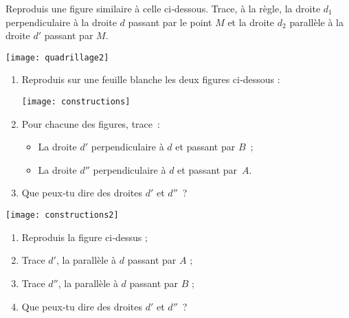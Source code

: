 \begin{exercice}[Quadrillage]
Reproduis une figure similaire à celle ci‑dessous. Trace, à la règle, la droite $d_1$ perpendiculaire à la droite $d$ passant par le point $M$ et la droite $d_2$ parallèle à la droite $d'$ passant par $M$.
\begin{center} \texttt{[image: quadrillage2]}  \end{center}
\end{exercice}


\begin{exercice}[Constructions]
\begin{enumerate}
 \item Reproduis sur une feuille blanche les deux figures ci‑dessous :
 \begin{center} \texttt{[image: constructions]}  \end{center}
 \item Pour chacune des figures, trace :
  \begin{itemize}
   \item La droite $d'$ perpendiculaire à $d$ et passant par $B$ ;
   \item La droite $d''$ perpendiculaire à $d$ et passant par $A$.
   \end{itemize}
 \item Que peux‑tu dire des droites $d'$ et $d''$ ?
 \end{enumerate}
\end{exercice}


\begin{exercice}
 \begin{center} \texttt{[image: constructions2]}  \end{center}
\begin{enumerate}
 \item Reproduis la figure ci‑dessus ;
 \item Trace $d'$, la parallèle à $d$ passant par $A$ ;
 \item Trace $d''$, la parallèle à $d$ passant par $B$ ;
 \item Que peux‑tu dire des droites $d'$ et $d''$ ?
 \end{enumerate}
\end{exercice}


